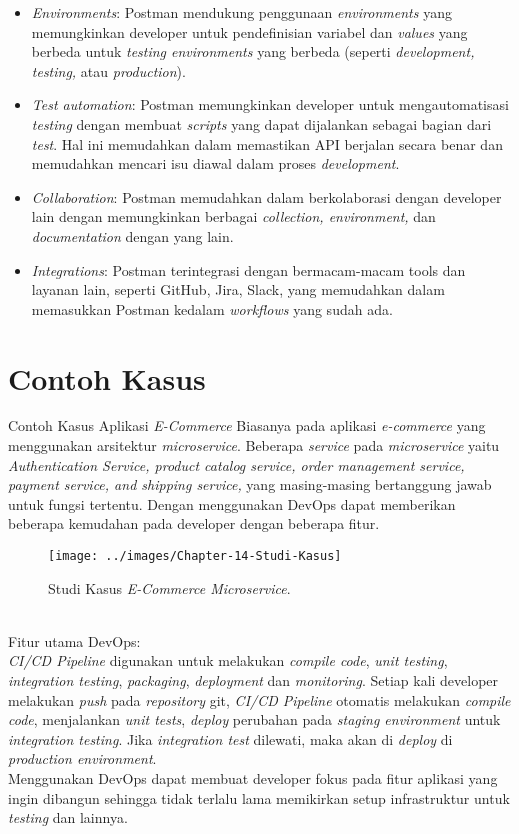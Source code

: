 \begin{enumerate}
\begin{itemize}
		\item \textit{Environments}: Postman mendukung penggunaan \textit{environments} yang memungkinkan developer untuk pendefinisian variabel dan \textit{values} yang berbeda untuk \textit{testing environments} yang berbeda (seperti \textit{development, testing,} atau \textit{production}).
		
		\item \textit{Test automation}: Postman memungkinkan developer untuk mengautomatisasi \textit{testing} dengan membuat \textit{scripts} yang dapat dijalankan sebagai bagian dari \textit{test}. Hal ini memudahkan dalam memastikan API berjalan secara benar dan memudahkan mencari isu diawal dalam proses \textit{development}.
		
		\item \textit{Collaboration}: Postman memudahkan dalam berkolaborasi dengan developer lain dengan memungkinkan berbagai \textit{collection, environment,} dan \textit{documentation} dengan yang lain.
		
		\item \textit{Integrations}: Postman terintegrasi dengan bermacam-macam tools dan layanan lain, seperti GitHub, Jira, Slack, yang memudahkan dalam memasukkan Postman kedalam \textit{workflows} yang sudah ada.
	\end{itemize}
\end{enumerate}
\section{Contoh Kasus}
Contoh Kasus Aplikasi \textit{E-Commerce}
Biasanya pada aplikasi \textit{e-commerce} yang menggunakan arsitektur \textit{microservice}. Beberapa \textit{service} pada \textit{microservice} yaitu
\textit{Authentication Service, product catalog service, order management service, payment service, and shipping service,} yang masing-masing bertanggung jawab untuk fungsi tertentu.
Dengan menggunakan DevOps dapat memberikan beberapa kemudahan pada developer dengan beberapa fitur.
\begin{figure}[h]
	\centering
	\texttt{[image: ../images/Chapter-14-Studi-Kasus]}
	\caption{Studi Kasus \textit{E-Commerce Microservice}.}
	\label{fig:client-server-schema}
\end{figure}
\\Fitur utama DevOps:
	\\\textit{CI/CD Pipeline} digunakan untuk melakukan \textit{compile code}, \textit{unit testing}, \textit{integration testing}, \textit{packaging}, \textit{deployment} dan \textit{monitoring}.
	Setiap kali developer melakukan \textit{push} pada \textit{repository} git, \textit{CI/CD Pipeline} otomatis melakukan \textit{compile code}, menjalankan \textit{unit tests},
	\textit{deploy} perubahan pada \textit{staging environment} untuk \textit{integration testing}. Jika \textit{integration test} dilewati, maka akan di \textit{deploy} di \textit{production environment}.
	\\Menggunakan DevOps dapat membuat developer fokus pada fitur aplikasi yang ingin dibangun sehingga tidak terlalu lama memikirkan setup infrastruktur untuk \textit{testing} dan lainnya.
